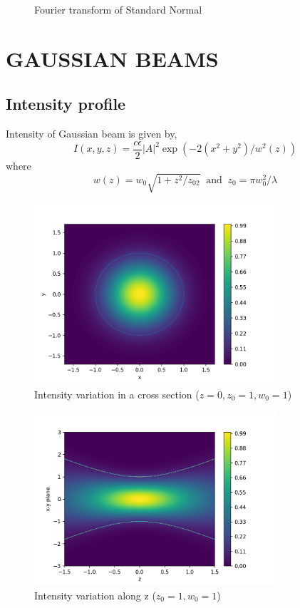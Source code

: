 \documentclass[11pt,a4paper]{article}
\begin{document}



\begin{figure}[ht]
	\centering
	\scalebox{1}{}
	\caption{Fourier transform of Standard Normal}
	\label{fig:fft_gaussian}
\end{figure}
\clearpage

\section{GAUSSIAN BEAMS}

\subsection{Intensity profile}
Intensity of Gaussian beam is given by,
$$I(x,y,z)=\frac{c\epsilon}{2} |A|^2 \exp{\left(-2(x^2+y^2)/w^2(z)\right)}$$ 
where
$$w(z)= w_0\sqrt{1+z^2/z_02} \;\; \text{and} \;\; z_0=\pi w_0^2/\lambda$$



\begin{figure}[htbp]
	\centering
	\includegraphics[width=9cm]{intensity.png}
	\caption{Intensity variation in a cross section ($z=0,z_0=1,w_0=1$)}
	\label{fig:intensity}
\end{figure}
\clearpage




\begin{figure}[H]
	\centering
	\includegraphics[width=9cm]{intensity_var.png}
	\caption{Intensity variation along z ($z_0=1,w_0=1$)}
	\label{fig:intensity_var}
\end{figure}
\clearpage
\end{document}
